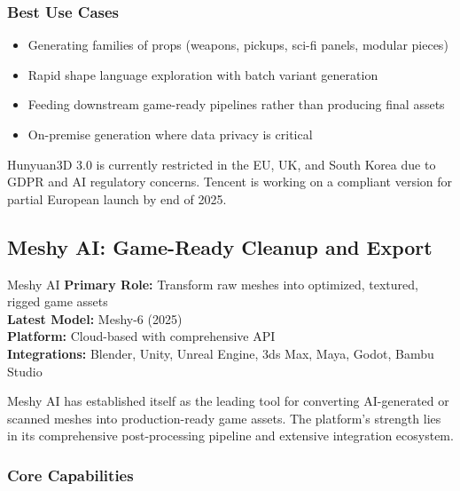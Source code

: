 \documentclass[11pt]{article}
\begin{document}
\subsubsection{Best Use Cases}

\begin{itemize}[leftmargin=2em]
  \item Generating families of props (weapons, pickups, sci-fi panels, modular pieces)
  \item Rapid shape language exploration with batch variant generation
  \item Feeding downstream game-ready pipelines rather than producing final assets
  \item On-premise generation where data privacy is critical
\end{itemize}

\begin{warning}
Hunyuan3D 3.0 is currently restricted in the EU, UK, and South Korea due to GDPR and AI regulatory concerns. Tencent is working on a compliant version for partial European launch by end of 2025.
\end{warning}

\subsection{Meshy AI: Game-Ready Cleanup and Export}

\begin{toolbox}{Meshy AI}
\textbf{Primary Role:} Transform raw meshes into optimized, textured, rigged game assets\\
\textbf{Latest Model:} Meshy-6 (2025)\\
\textbf{Platform:} Cloud-based with comprehensive API\\
\textbf{Integrations:} Blender, Unity, Unreal Engine, 3ds Max, Maya, Godot, Bambu Studio
\end{toolbox}

Meshy AI has established itself as the leading tool for converting AI-generated or scanned meshes into production-ready game assets. The platform's strength lies in its comprehensive post-processing pipeline and extensive integration ecosystem.

\subsubsection{Core Capabilities}
\end{document}
